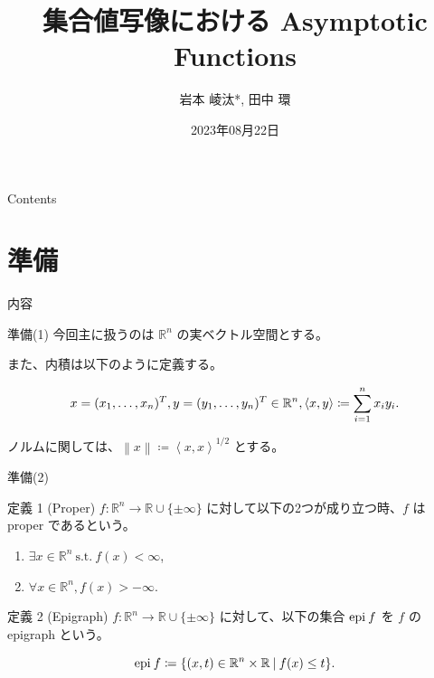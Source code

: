 \documentclass[aspectratio=169, dvipdfmx, 11pt]{beamer} %
\title[博士後期課程入学試験]{集合値写像における Asymptotic Functions}
\author[岩本 崚汰]{岩本 崚汰*, 田中 環}
\institute[新潟大学大学院自然科学研究科]{新潟大学大学院自然科学研究科}
\date{2023年08月22日}
\newcommand{\RealNumberSet}{\mathbb{R}}
\newcommand{\NDemenstionalRealEuclidianSpace}{\mathbb{R}^n}
\newcommand{\Epigraph}[1]{\text{epi\:${#1}$}} %
\newcommand{\SuchThat}{\:\text{s.t.}\:}
\newcommand{\SetForm}[2]{
  \{{#1}\:|\:{#2}\}
}
\begin{document}
\maketitle

\begin{frame}{Contents}
  \tableofcontents
\end{frame}

\section{準備}
\begin{frame}{内容}
  \tableofcontents[currentsection]
\end{frame}

\begin{frame}{準備(1)}
  今回主に扱うのは $\mathbb{R}^n$ の実ベクトル空間とする。

  また、内積は以下のように定義する。

  \begin{equation}
    x=(x_1,\dots,x_n)^T, y=(y_1,\dots,y_n)^T \in \mathbb{R}^n, \left\langle x,y\right\rangle \coloneqq \sum_{i = 1}^{n} x_i y_i. \notag
  \end{equation}

  ノルムに関しては、$\left\lVert x \right\rVert \coloneqq \left\langle x,x\right\rangle ^{1/2} $ とする。
\end{frame}

\begin{frame}{準備(2)}
  \begin{block}{定義 1 (Proper) \cite{ref1}}
    $f: \NDemenstionalRealEuclidianSpace \rightarrow \RealNumberSet \cup \{\pm \infty\}$ に対して以下の2つが成り立つ時、$f$ は proper であるという。
    \begin{enumerate}
      \item $\exists x \in \NDemenstionalRealEuclidianSpace \SuchThat f(x) < \infty$,
      \item $\forall x \in \NDemenstionalRealEuclidianSpace, f(x) > -\infty$.
    \end{enumerate}
  \end{block}

  \begin{block}{定義 2 (Epigraph) \cite{ref1}}
    $f: \NDemenstionalRealEuclidianSpace \rightarrow \RealNumberSet \cup \{\pm \infty\}$ に対して、以下の集合 $\Epigraph{f}$ を $f$ の epigraph という。

    \begin{equation}
      \Epigraph{f} \coloneqq \SetForm{(x,t) \in \NDemenstionalRealEuclidianSpace \times \RealNumberSet}{f(x) \leq t}. \notag
    \end{equation}
  \end{block}
\end{frame}
\end{document}
